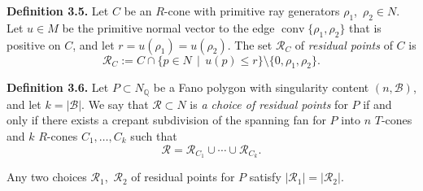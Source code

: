\par\noindent\textbf{Definition 3.5.} 
Let $C$ be an $R$-cone with primitive ray generators $\rho_1$,~$\rho_2 \in N$. Let $u \in M$ be the primitive normal vector to the edge $\operatorname{conv}\{\rho_1,\rho_2\}$ that is positive on $C$, and let $r = u(\rho_1) = u(\rho_2)$. The set $\mathcal{R}_C$ of \emph{residual points} of $C$ is
\[
\mathcal{R}_C := C \cap \{p \in N \, \mid \, u(p) \leq r\} \setminus \{0, \rho_1, \rho_2\}.
\]

\par

\par\noindent\textbf{Definition 3.6.} 
Let $P \subset {N_{\mathbb{Q}}}$ be a Fano polygon with singularity content $(n, \mathcal{B})$, and let $k = |\mathcal{B}|$. We say that $\mathcal{R} \subset N$ is \emph{a choice of residual points} for $P$ if and only if there exists a crepant subdivision of the spanning fan for $P$ into $n$ $T$-cones and $k$ $R$-cones $C_1,\ldots,C_k$ such that 
\[
\mathcal{R} = \mathcal{R}_{C_1} \cup \cdots \cup \mathcal{R}_{C_k}.
\] 

\par
\noindent Any two choices $\mathcal{R}_1$,~$\mathcal{R}_2$ of residual points for $P$ satisfy $|\mathcal{R}_1| = |\mathcal{R}_2|$.
